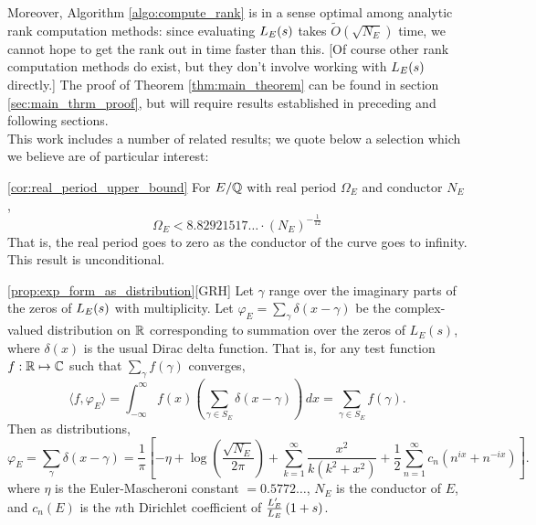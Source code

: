 Moreover, Algorithm \ref{algo:compute_rank} is in a sense optimal among analytic rank computation methods: since evaluating $L_E(s)$ takes $\tilde{O}(\sqrt{N_E})$ time, we cannot hope to get the rank out in time faster than this. [Of course other rank computation methods do exist, but they don't involve working with $L_E(s)$ directly.] The proof of Theorem \ref{thm:main_theorem} can be found in section \ref{sec:main_thrm_proof}, but will require results established in preceding and following sections. \\

This work includes a number of related results; we quote below a selection which we believe are of particular interest:

\begin{quotedcorollary}{\ref{cor:real_period_upper_bound}}
For $E/\mathbb{Q}$ with real period $\Omega_E$ and conductor $N_E$,
\begin{equation}
\Omega_E < 8.82921517\ldots \cdot (N_E)^{-\frac{1}{12}}
\end{equation}
That is, the real period goes to zero as the conductor of the curve goes to infinity. This result is unconditional.
\end{quotedcorollary}

\begin{quotedtheorem}{\ref{prop:exp_form_as_distribution}}[GRH]
Let $\gamma$ range over the imaginary parts of the zeros of $L_E(s)$ with multiplicity. Let $\varphi_E = \sum_{\gamma} \delta(x-\gamma)$ be the complex-valued distribution on $\mathbb{R}$ corresponding to summation over the zeros of $L_E(s)$, where $\delta(x)$ is the usual Dirac delta function. That is, for any test function $f: \mathbb{R} \mapsto \mathbb{C}$ such that $\sum_{\gamma}f(\gamma)$ converges, 
\begin{equation}
\langle f,\varphi_E \rangle = \int_{-\infty}^{\infty} f(x)\left(\sum_{\gamma\in S_E} \delta(x-\gamma)\right) \, dx = \sum_{\gamma\in S_E} f(\gamma).
\end{equation}
Then as distributions,
\begin{equation}\label{eqn:exp_form_3}
\varphi_E = \sum_{\gamma} \delta(x-\gamma) = \frac{1}{\pi}\left[-\eta + \log\left(\frac{\sqrt{N_E}}{2\pi}\right) +\sum_{k=1}^{\infty} \frac{x^2}{k(k^2+x^2)} + \frac{1}{2}\sum_{n=1}^{\infty} c_n \left(n^{ix}+n^{-ix}\right) \right].
\end{equation}
where $\eta$ is the Euler-Mascheroni constant $= 0.5772\ldots$, $N_E$ is the conductor of $E$, and $c_n(E)$ is the $n$th Dirichlet coefficient of $\frac{L_E^{\prime}}{L_E}\left(1+s\right)$.
\end{quotedtheorem}

